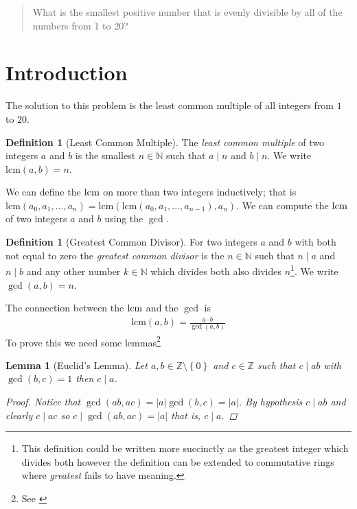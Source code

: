 \documentclass[oneside,12pt]{book}   	%
\newcounter{ex}
\newcounter{def}
\newcounter{pr}
\newtheorem{lem}[thm]{Lemma}
\theoremstyle{definition}
\newtheorem{definition}[thm]{Definition}
\newcommand{\lcm}[1]{\mathrm{lcm }#1}
\newcommand{\set}[1]{\left\{#1\right\}}
\newcommand{\order}[1]{\left| #1 \right|}
\begin{document}
\begin{spacing}{1.618}
\begin{quote}
			What is the smallest positive number that is evenly divisible by all of the numbers from 1 to 20?
		\end{quote}
	
		\section{Introduction}
		
			The solution to this problem is the least common multiple of all integers from $1$ to $20$. 
			\begin{definition}[Least Common Multiple]
				The \emph{least common multiple} of two integers $a$ and $b$ is the smallest $n\in\mathbb{N}$ such that $a\mid n$ and $b\mid n$. We write $\lcm{(a, b)}=n$. 
			\end{definition}
			We can define the $\lcm$ on more than two integers inductively; that is $\lcm{\left(a_0, a_1, \dots, a_n\right)} = \lcm{\left(\lcm{\left(a_0, a_1, \dots, a_{n-1}\right)}, a_n\right)}$. We can compute the $\lcm$ of two integers $a$ and $b$ using the $\gcd$. 
			\begin{definition}[Greatest Common Divisor]
				For two integers $a$ and $b$ with both not equal to zero the \emph{greatest common divisor} is the $n\in\mathbb{N}$ such that $n\mid a$ and $n\mid b$ and any other number $k\in\mathbb{N}$ which divides both also divides $n$\footnote{This definition could be written more succinctly as the greatest integer which divides both however the definition can be extended to commutative rings where \emph{greatest} fails to have meaning.}. We write $\gcd{(a, b)}=n$. 
			\end{definition}
			
			The connection between the $\lcm$ and the $\gcd$ is
			\begin{alignat}{4}
				\lcm{(a, b)}=\frac{a\cdot b}{\gcd{(a, b)}}\label{E:5:1}
			\end{alignat}
			To prove this we need some lemmas\footnote{See \cite{Molin2008}}
			\begin{lem}[Euclid's Lemma]\label{Lem:5:1}
				Let $a,b\in\mathbb{Z}\setminus\set{0}$ and $c\in\mathbb{Z}$ such that $c\mid ab$ with $\gcd{(b,c)}=1$ then $c\mid a$. 
				\begin{proof}
					Notice that $\gcd{(ab, ac)}=\order{a}\gcd{(b,c)}=\order{a}$. By hypothesis $c\mid ab$ and clearly $c\mid ac$ so $c\mid\gcd{(ab, ac)}=\order{a}$ that is, $c\mid a$. 
				\end{proof}
			\end{lem}
			

\end{spacing}
\end{document}
